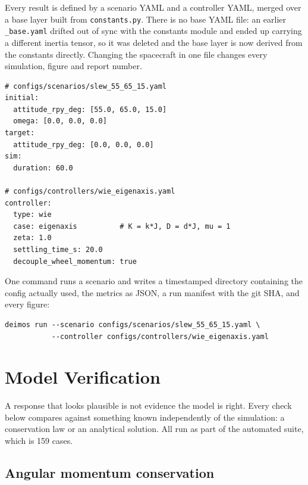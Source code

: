 \documentclass[conference,10pt,a4paper]{IEEEtran}
\begin{document}
Every result is defined by a scenario YAML and a controller YAML, merged over a
base layer built from \texttt{constants.py}. There is no base YAML file: an
earlier \texttt{\_base.yaml} drifted out of sync with the constants module and
ended up carrying a different inertia tensor, so it was deleted and the base
layer is now derived from the constants directly. Changing the spacecraft in
one file changes every simulation, figure and report number.

\begin{lstlisting}[caption={Scenario and controller presets. The base layer
(satellite, wheels, magnetorquer hardware) comes from
\texttt{constants.py}.},captionpos=b,label={lst:yaml}]
# configs/scenarios/slew_55_65_15.yaml
initial:
  attitude_rpy_deg: [55.0, 65.0, 15.0]
  omega: [0.0, 0.0, 0.0]
target:
  attitude_rpy_deg: [0.0, 0.0, 0.0]
sim:
  duration: 60.0

# configs/controllers/wie_eigenaxis.yaml
controller:
  type: wie
  case: eigenaxis          # K = k*J, D = d*J, mu = 1
  zeta: 1.0
  settling_time_s: 20.0
  decouple_wheel_momentum: true
\end{lstlisting}

One command runs a scenario and writes a timestamped directory containing the
config actually used, the metrics as JSON, a run manifest with the git SHA, and
every figure:

\begin{lstlisting}
deimos run --scenario configs/scenarios/slew_55_65_15.yaml \
           --controller configs/controllers/wie_eigenaxis.yaml
\end{lstlisting}

\section{Model Verification}
\label{sec:verification}

A response that looks plausible is not evidence the model is right. Every check
below compares against something known independently of the simulation: a
conservation law or an analytical solution. All run as part of the automated
suite, which is 159 cases.

\subsection{Angular momentum conservation}
\label{sec:momentum}
\end{document}
